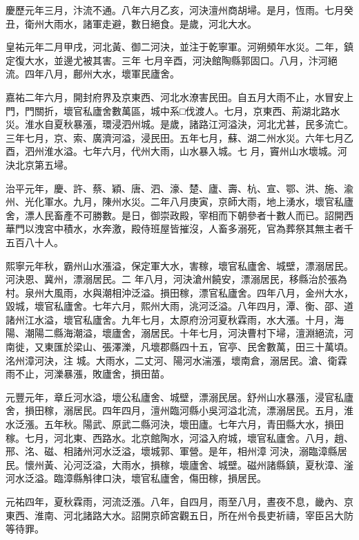 \begin{pinyinscope}
 慶歷元年三月，汴流不通。八年六月乙亥，河決澶州商胡埽。是月，恆雨。七月癸丑，衛州大雨水，諸軍走避，數日絕食。是歲，河北大水。



 皇祐元年二月甲戌，河北黃、御二河決，並注于乾寧軍。河朔頻年水災。二年，鎮定復大水，並邊尤被其害。三年
 七月辛酉，河決館陶縣郭固口。八月，汴河絕流。四年八月，鄜州大水，壞軍民廬舍。



 嘉祐二年六月，開封府界及京東西、河北水潦害民田。自五月大雨不止，水冒安上門，門關折，壞官私廬舍數萬區，城中系□伐渡人。七月，京東西、荊湖北路水災。淮水自夏秋暴漲，環浸泗州城。是歲，諸路江河溢決，河北尤甚，民多流亡。三年七月，京、索、廣濟河溢，浸民田。五年七月，蘇、湖二州水災。六年七月乙酉，泗州淮水溢。七年六月，代州大雨，山水暴入城。七
 月，竇州山水壞城。河決北京第五埽。



 治平元年，慶、許、蔡、穎、唐、泗、濠、楚、廬、壽、杭、宣、鄂、洪、施、渝州、光化軍水。九月，陳州水災。二年八月庚寅，京師大雨，地上湧水，壞官私廬舍，漂人民畜產不可勝數。是日，御崇政殿，宰相而下朝參者十數人而已。詔開西華門以洩宮中積水，水奔激，殿侍班屋皆摧沒，人畜多溺死，官為葬祭其無主者千五百八十人。



 熙寧元年秋，霸州山水漲溢，保定軍大水，害稼，壞官私廬舍、城壁，漂溺居民。河決恩、冀州，漂溺居民。二
 年八月，河決滄州饒安，漂溺居民，移縣治於張為村。泉州大風雨，水與潮相沖泛溢。損田稼，漂官私廬舍。四年八月，金州大水，毀城，壞官私廬舍。七年六月，熙州大雨，洮河泛溢。八年四月，潭、衡、邵、道諸州江水溢，壞官私廬舍。九年七月，太原府汾河夏秋霖雨，水大漲。十月，海陽、潮陽二縣海潮溢，壞廬舍，溺居民。十年七月，河決曹村下埽，澶淵絕流，河南徙，又東匯於梁山、張澤濼，凡壞郡縣四十五，官亭、民舍數萬，田三十萬頃。洺州漳河決，注
 城。大雨水，二丈河、陽河水湍漲，壞南倉，溺居民。滄、衛霖雨不止，河濼暴漲，敗廬舍，損田苗。



 元豐元年，章丘河水溢，壞公私廬舍、城壁，漂溺民居。舒州山水暴漲，浸官私廬舍，損田稼，溺居民。四年四月，澶州臨河縣小吳河溢北流，漂溺居民。五月，淮水泛漲。五年秋。陽武、原武二縣河決，壞田廬。七年六月，青田縣大水，損田稼。七月，河北東、西路水。北京館陶水，河溢入府城，壞官私廬舍。八月，趙、邢、洺、磁、相諸州河水泛溢，壞城郭、軍營。是年，相州漳
 河決，溺臨漳縣居民。懷州黃、沁河泛溢，大雨水，損稼，壞廬舍、城壁。磁州諸縣鎮，夏秋漳、滏河水泛溢。臨漳縣斛律口決，壞官私廬舍，傷田稼，損居民。



 元祐四年，夏秋霖雨，河流泛漲。八年，自四月，雨至八月，晝夜不息，畿內、京東西、淮南、河北諸路大水。詔開京師宮觀五日，所在州令長吏祈禱，宰臣呂大防等待罪。




\end{pinyinscope}
